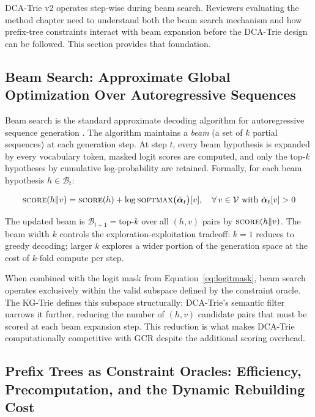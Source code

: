 DCA-Trie v2 operates step-wise during beam search. Reviewers evaluating the
method chapter need to understand both the beam search mechanism and how
prefix-tree constraints interact with beam expansion before the DCA-Trie design
can be followed. This section provides that foundation.

\subsection{Beam Search: Approximate Global Optimization Over Autoregressive
    Sequences}

Beam search is the standard approximate decoding algorithm for autoregressive sequence generation \citep{holtzman2020curious}. The algorithm maintains a
\textit{beam} (a set of $k$ partial sequences) at each generation step. At
step $t$, every beam hypothesis is expanded by every vocabulary token, masked
logit scores are computed, and only the top-$k$ hypotheses by cumulative
log-probability are retained. Formally, for each beam hypothesis
$h \in \mathcal{B}_t$:

\begin{equation}
    \textsc{score}(h \| v) = \textsc{score}(h) +
    \log \textsc{softmax}\bigl(\tilde{\boldsymbol{\alpha}}_t\bigr)[v],
    \quad \forall\, v \in \mathcal{V} \text{ with } \tilde{\boldsymbol{\alpha}}_t[v] > 0
    \label{eq:beamsearch}
\end{equation}

The updated beam is $\mathcal{B}_{t+1} = \text{top-}k$ over all $(h, v)$
pairs by $\textsc{score}(h \| v)$. The beam width $k$ controls the
exploration-exploitation tradeoff: $k = 1$ reduces to greedy decoding; larger
$k$ explores a wider portion of the generation space at the cost of $k$-fold
compute per step.

When combined with the logit mask from Equation~\eqref{eq:logitmask}, beam
search operates exclusively within the valid subspace defined by the constraint
oracle. The KG-Trie defines this subspace structurally; DCA-Trie's semantic
filter narrows it further, reducing the number of $(h, v)$ candidate pairs that
must be scored at each beam expansion step. This reduction is what makes
DCA-Trie computationally competitive with GCR despite the additional scoring
overhead.

\subsection{Prefix Trees as Constraint Oracles: Efficiency, Precomputation, and
    the Dynamic Rebuilding Cost}

